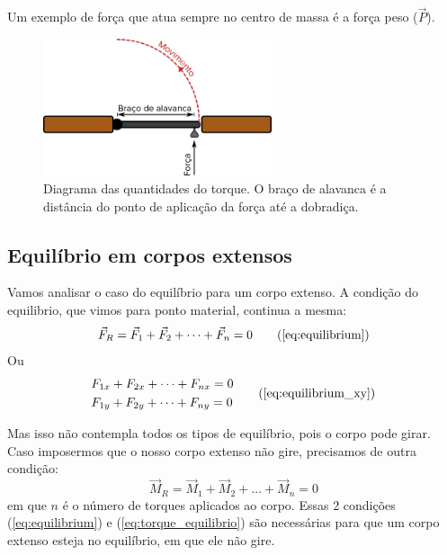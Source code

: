\documentclass[12pt]{extarticle}
\newcommand{\<}{\langle}
\renewcommand{\>}{\rangle}
\theoremstyle{definition}
\begin{document}
Um exemplo de força que atua sempre no centro de massa é a força peso ($\vec{P}$).

\begin{figure}[H]
    \centering
    \includegraphics[width=0.6\textwidth]{torque.png}
    \caption{Diagrama das quantidades do torque. O braço de alavanca é a distância do ponto de aplicação da força até a dobradiça.}
    \label{fig:torque_porta}
\end{figure}

\subsection{Equilíbrio em corpos extensos}

Vamos analisar o caso do equilíbrio para um corpo extenso. A condição do equilibrio, que vimos para ponto material, continua a mesma:
\begin{equation}
    \vec{F}_R=\vec{F}_1 + \vec{F}_2 + \dots + \vec{F}_n = 0 \tag{\ref{eq:equilibrium}}
\end{equation}
Ou
\begin{equation}
    \begin{split}
        &F_{1x} + F_{2x} + \dots + F_{nx} = 0\\
        &F_{1y} + F_{2y} + \dots + F_{ny} = 0\\
    \end{split}
    \tag{\ref{eq:equilibrium_xy}}
\end{equation}

Mas isso não contempla todos os tipos de equilíbrio, pois o corpo pode girar. Caso imposermos que o nosso corpo extenso não gire, precisamos de outra condição: 
\begin{equation}\label{eq:torque_equilibrio}
    \vec{M}_R=\vec{M}_1 + \vec{M}_2 + \dots + \vec{M}_n=0
\end{equation}
\noindent em que $n$ é o número de torques aplicados ao corpo. Essas 2 condições (\ref{eq:equilibrium}) e (\ref{eq:torque_equilibrio}) são necessárias para que um corpo extenso esteja no equilíbrio, em que ele não gire.
\end{document}
